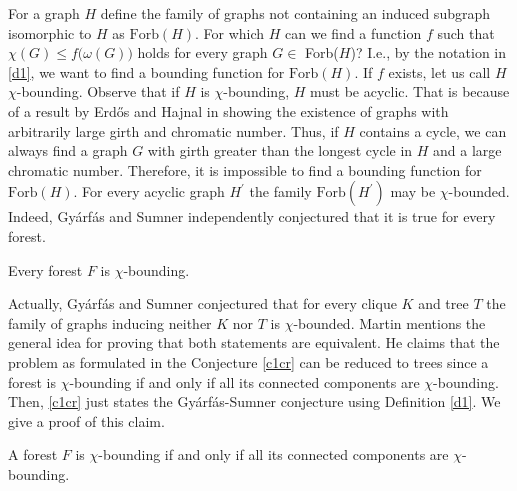 For a graph $H$ define the family of graphs not containing an induced subgraph isomorphic to $H$ as $\text{Forb}(H)$. For which $H$ can we find a function $f$ such that $\chi (G)\leq f\big(\omega (G)\big)$ holds for every graph $G\in$ Forb($H$)? I.e., by the notation in \ref{d1}, we want to find a bounding function for $\text{Forb}(H)$. If $f$ exists, let us call $H$ $\chi $-bounding. Observe that if $H$ is $\chi $-bounding, $H$ must be acyclic. That is because of a result by Erd\H{o}s and Hajnal in \cite{EH66} showing the existence of graphs with arbitrarily large girth and chromatic number. Thus, if $H$ contains a cycle, we can always find a graph $G$ with girth greater than the longest cycle in $H$ and a large chromatic number. Therefore, it is impossible to find a bounding function for $\text{Forb}(H)$. For every acyclic graph $H^\prime$ the family $\text{Forb}(H^\prime )$ may be $\chi$-bounded. Indeed, Gyárfás \cite{Gy75} and Sumner \cite{Su81} independently conjectured that it is true for every forest.

\begin{con}\label{c1cr}
Every forest $F$ is $\chi$-bounding.
\end{con}

Actually, Gyárfás and Sumner conjectured that for every clique $K$ and tree $T$ the family of graphs inducing neither $K$ nor $T$ is $\chi$-bounded. Martin \cite{Ma16} mentions the general idea for proving that both statements are equivalent. He claims that the problem as formulated in the Conjecture \ref{c1cr} can be reduced to trees since a forest is $\chi$-bounding if and only if all its connected components are $\chi$-bounding. Then, \ref{c1cr} just states the Gyárfás-Sumner conjecture using Definition \ref{d1}. We give a proof of this claim.

\begin{thm}
A forest $F$ is $\chi$-bounding if and only if all its connected components are $\chi$-bounding.
\end{thm}

